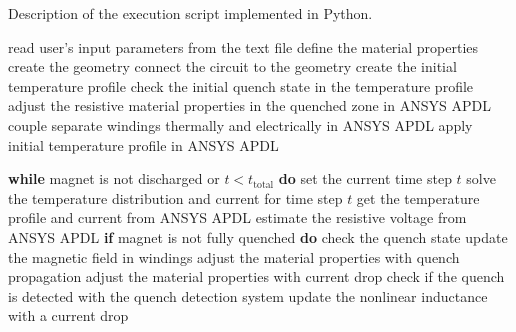 \begin{algorithm}[H]
  \caption{Description of the execution script implemented in Python.}
  \label{alg:execution_script}
  \begin{algorithmic}[1]
    \STATE read user's input parameters from the text file
    \color{red} \STATE  define the material properties
    \STATE create the geometry 
    \STATE connect the circuit to the geometry
    \STATE create the initial temperature profile
    \STATE check the initial quench state in the temperature profile
    \STATE adjust the resistive material properties in the quenched zone in ANSYS APDL
    \STATE couple separate windings thermally and electrically in ANSYS APDL
    \color{blue} \STATE apply initial temperature profile in ANSYS APDL
    
    \color{black} \STATE \textbf{while} magnet is not discharged or $t < t_\text{total}$ \textbf{do}
        \color{blue} \STATE \hspace{0.5cm} set the current time step $t$
        \STATE \hspace{0.5cm} solve the temperature distribution and current for time step $t$
        \color{ForestGreen} \STATE \hspace{0.5cm} get the temperature profile and current from ANSYS APDL
        \STATE \hspace{0.5cm} estimate the resistive voltage from ANSYS APDL
        \STATE \hspace{0.5cm} \textbf{if} magnet is not fully quenched \textbf{do}
        \STATE \hspace{1.5cm} check the quench state
        \STATE \hspace{1.5cm} update the magnetic field in windings
        \color{red} \STATE \hspace{1.5cm} adjust the material properties with quench propagation
        \color{red} \STATE \hspace{0.5cm} adjust the material properties with current drop
        \STATE \hspace{0.5cm} check if the quench is detected with the quench detection system
        \STATE \hspace{0.5cm} update the nonlinear inductance with a current drop
  \end{algorithmic}
\end{algorithm}
